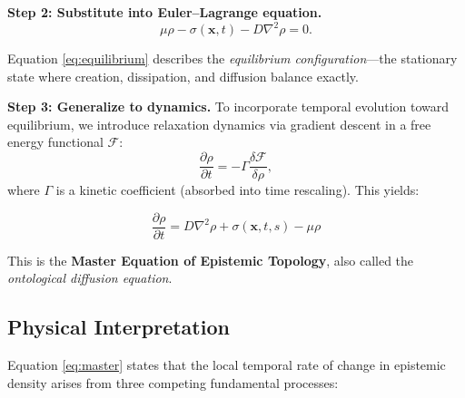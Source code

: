 \documentclass[12pt]{article}
\begin{document}
\textbf{Step 2: Substitute into Euler--Lagrange equation.}
\begin{equation}
    \mu\rho - \sigma(\mathbf{x},t) - D\nabla^2\rho = 0.
    \label{eq:equilibrium}
\end{equation}

Equation \eqref{eq:equilibrium} describes the \emph{equilibrium configuration}---the stationary state where creation, dissipation, and diffusion balance exactly.

\textbf{Step 3: Generalize to dynamics.}
To incorporate temporal evolution toward equilibrium, we introduce relaxation dynamics via gradient descent in a free energy functional $\mathcal{F}$:
\begin{equation}
    \frac{\partial \rho}{\partial t} = -\Gamma \frac{\delta \mathcal{F}}{\delta \rho},
\end{equation}
where $\Gamma$ is a kinetic coefficient (absorbed into time rescaling). This yields:

\begin{equation}
    \boxed{\frac{\partial \rho}{\partial t} = D \nabla^2 \rho + \sigma(\mathbf{x},t,s) - \mu \rho}
    \label{eq:master}
\end{equation}

This is the \textbf{Master Equation of Epistemic Topology}, also called the \emph{ontological diffusion equation}.

\subsection{Physical Interpretation}

Equation \eqref{eq:master} states that the local temporal rate of change in epistemic density arises from three competing fundamental processes:
\end{document}
